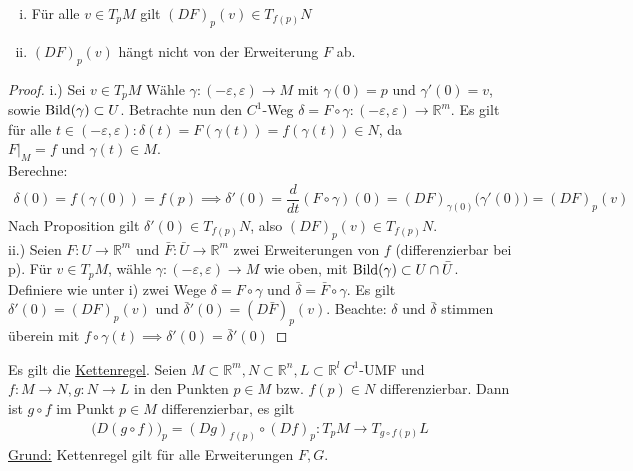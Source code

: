 \documentclass[../main.tex]{subfiles}
\begin{document}
\begin{lemma}
\begin{enumerate}[i.)]
    \item Für alle $v \in T_pM$ gilt $(DF)_p(v) \in T_{f(p)}N$
    \item $(DF)_p(v)$ hängt nicht von der Erweiterung $F$ ab.
\end{enumerate}
\end{lemma}
\begin{proof}
i.) Sei $v \in T_pM$ Wähle $\gamma : (-\varepsilon, \varepsilon) \to M$ mit $\gamma (0) =p$ und
$\gamma'(0)=v$, sowie $\operatorname{Bild}(\gamma) \subset U$. Betrachte nun den $C^1$-Weg
$\delta = F \circ \gamma : (-\varepsilon, \varepsilon) \to \mathbb{R}^m$.
Es gilt für alle $ t\in (-\varepsilon, \varepsilon) : \delta(t) = F(\gamma(t)) = f(\gamma(t)) \in N$, da $F\vert_M = f \text{ und } \gamma(t) \in M$. \\
Berechne:
\begin{align*}
    \delta(0) = f(\gamma(0)) = f(p) \implies \delta'(0) = \dfrac{d}{dt}(F \circ \gamma)(0) = (DF)_{\gamma(0)}\big(\gamma'(0)\big) = (DF)_p(v)
\end{align*}Nach Proposition gilt $\delta'(0) \in T_{f(p)}N$, also $(DF)_p(v) \in T_{f(p)}N$. \\

ii.)
Seien $F:U \to \mathbb{R}^m$ und $\bar F : \bar U \to \mathbb{R}^m$ zwei Erweiterungen von $f$ (differenzierbar bei p). Für $v \in T_pM$, wähle $\gamma:(-\varepsilon,\varepsilon)\to M$ wie oben, mit $\operatorname{Bild}(\gamma) \subset U \cap \bar U$. Definiere wie unter i) zwei Wege $\delta = F \circ \gamma$ und
$\bar \delta = \bar F \circ \gamma$.
Es gilt $\delta '(0)=(DF)_p(v)$ und $\bar \delta '(0) = (D\bar F)_p(v)$.
Beachte: $\delta$ und $\bar \delta$ stimmen überein mit $f \circ \gamma (t) \implies \delta'(0)=\bar \delta'(0)$
\end{proof}

\begin{remark}
Es gilt die \underline{Kettenregel}. Seien $M \subset \mathbb{R}^m,N\subset \mathbb{R}^n, L \subset \mathbb{R}^l \ C^1$-UMF und $f:M\to N , g:N \to L$ in den Punkten $p \in M$ bzw. $f(p)\in N$ differenzierbar.
Dann ist $g \circ f$ im Punkt $p \in M$ differenzierbar, es gilt
\begin{align*}
    \big(D(g \circ f)\big)_p = (Dg)_{f(p)} \circ (Df)_p : T_pM \to T_{g\circ f(p)}L
\end{align*}
\underline{Grund:} Kettenregel gilt für alle Erweiterungen $F, G$.
\end{remark}
\end{document}
